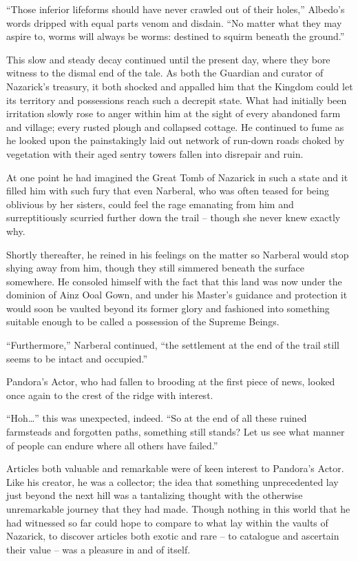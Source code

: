  

“Those inferior lifeforms should have never crawled out of their holes,” Albedo’s words dripped with equal parts venom and disdain. “No matter what they may aspire to, worms will always be worms: destined to squirm beneath the ground.”

 

This slow and steady decay continued until the present day, where they bore witness to the dismal end of the tale. As both the Guardian and curator of Nazarick’s treasury, it both shocked and appalled him that the Kingdom could let its territory and possessions reach such a decrepit state. What had initially been irritation slowly rose to anger within him at the sight of every abandoned farm and village; every rusted plough and collapsed cottage. He continued to fume as he looked upon the painstakingly laid out network of run-down roads choked by vegetation with their aged sentry towers fallen into disrepair and ruin.

 

At one point he had imagined the Great Tomb of Nazarick in such a state and it filled him with such fury that even Narberal, who was often teased for being oblivious by her sisters, could feel the rage emanating from him and surreptitiously scurried further down the trail – though she never knew exactly why.

 

Shortly thereafter, he reined in his feelings on the matter so Narberal would stop shying away from him, though they still simmered beneath the surface somewhere. He consoled himself with the fact that this land was now under the dominion of Ainz Ooal Gown, and under his Master’s guidance and protection it would soon be vaulted beyond its former glory and fashioned into something suitable enough to be called a possession of the Supreme Beings.

 

“Furthermore,” Narberal continued, “the settlement at the end of the trail still seems to be intact and occupied.”

 

Pandora’s Actor, who had fallen to brooding at the first piece of news, looked once again to the crest of the ridge with interest.

 

“Hoh…” this was unexpected, indeed. “So at the end of all these ruined farmsteads and forgotten paths, something still stands? Let us see what manner of people can endure where all others have failed.”

 

Articles both valuable and remarkable were of keen interest to Pandora’s Actor. Like his creator, he was a collector; the idea that something unprecedented lay just beyond the next hill was a tantalizing thought with the otherwise unremarkable journey that they had made. Though nothing in this world that he had witnessed so far could hope to compare to what lay within the vaults of Nazarick, to discover articles both exotic and rare – to catalogue and ascertain their value – was a pleasure in and of itself.
